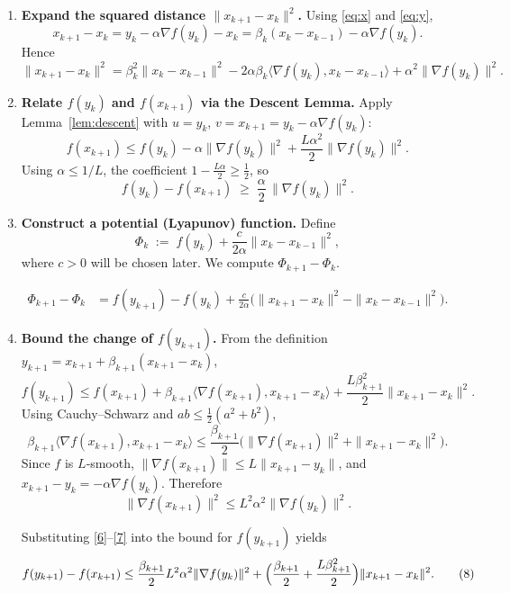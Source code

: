 \documentclass{article}
\begin{document}
\begin{enumerate}
\item[Step 1.] \textbf{Expand the squared distance $\|x_{k+1}-x_k\|^2$.}
Using \eqref{eq:x} and \eqref{eq:y},
\[
x_{k+1}-x_k
= y_k-\alpha\nabla f(y_k)-x_k
= \beta_k(x_k-x_{k-1})-\alpha\nabla f(y_k).
\]
Hence
\begin{equation}
\|x_{k+1}-x_k\|^2
= \beta_k^2\|x_k-x_{k-1}\|^2
   -2\alpha\beta_k\langle\nabla f(y_k),x_k-x_{k-1}\rangle
   +\alpha^2\|\nabla f(y_k)\|^2 .
\tag{3}
\end{equation}

\item[Step 2.] \textbf{Relate $f(y_k)$ and $f(x_{k+1})$ via the Descent Lemma.}
Apply Lemma~\ref{lem:descent} with $u=y_k$, $v=x_{k+1}=y_k-\alpha\nabla f(y_k)$:
\[
f(x_{k+1})\le f(y_k)-\alpha\|\nabla f(y_k)\|^2
            +\frac{L\alpha^2}{2}\|\nabla f(y_k)\|^2 .
\]
Using $\alpha\le 1/L$, the coefficient $1-\frac{L\alpha}{2}\ge \frac12$, so
\begin{equation}
f(y_k)-f(x_{k+1}) \;\ge\; \frac{\alpha}{2}\,\|\nabla f(y_k)\|^2 .
\tag{4}
\end{equation}

\item[Step 3.] \textbf{Construct a potential (Lyapunov) function.}
Define
\[
\Phi_k \;:=\; f(y_k) + \frac{c}{2\alpha}\|x_k-x_{k-1}\|^2 ,
\]
where $c>0$ will be chosen later.  We compute $\Phi_{k+1}-\Phi_k$.

\begin{align}
\Phi_{k+1}-\Phi_k
&= f(y_{k+1})-f(y_k) 
   +\frac{c}{2\alpha}\bigl(\|x_{k+1}-x_k\|^2-\|x_k-x_{k-1}\|^2\bigr). \tag{5}
\end{align}

\item[Step 4.] \textbf{Bound the change of $f(y_{k+1})$.}
From the definition $y_{k+1}=x_{k+1}+\beta_{k+1}(x_{k+1}-x_k)$,
\[
f(y_{k+1}) \le f(x_{k+1}) + \beta_{k+1}\langle\nabla f(x_{k+1}),
        x_{k+1}-x_k\rangle
        +\frac{L\beta_{k+1}^2}{2}\|x_{k+1}-x_k\|^2 .
\]
Using Cauchy–Schwarz and $ab\le \tfrac{1}{2}(a^2+b^2)$,
\[
\beta_{k+1}\langle\nabla f(x_{k+1}),x_{k+1}-x_k\rangle
\le \frac{\beta_{k+1}}{2}\bigl(\|\nabla f(x_{k+1})\|^2
      +\|x_{k+1}-x_k\|^2\bigr).
\tag{6}
\]
Since $f$ is $L$‑smooth, $\|\nabla f(x_{k+1})\|\le L\|x_{k+1}-y_k\|$,
and $x_{k+1}-y_k=-\alpha\nabla f(y_k)$.  Therefore
\[
\|\nabla f(x_{k+1})\|^2 \le L^2\alpha^2\|\nabla f(y_k)\|^2 .
\tag{7}
\]

Substituting \eqref{6}–\eqref{7} into the bound for $f(y_{k+1})$ yields
\begin{equation}
f(y_{k+1})-f(x_{k+1})
\le \frac{\beta_{k+1}}{2}L^2\alpha^2\|\nabla f(y_k)\|^2
   +\Bigl(\frac{\beta_{k+1}}{2}
          +\frac{L\beta_{k+1}^2}{2}\Bigr)\|x_{k+1}-x_k\|^2 .
\tag{8}
\end{equation}


\end{enumerate}
\end{document}
